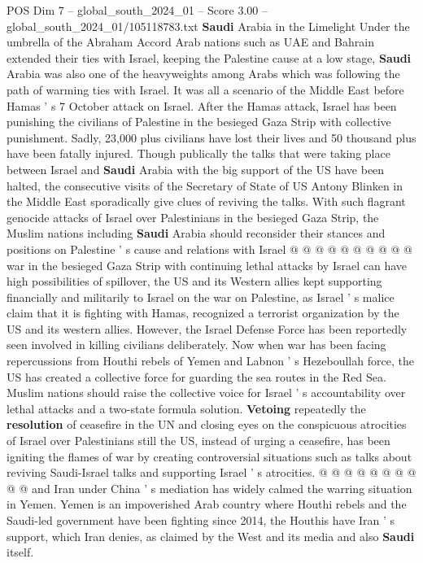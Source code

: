 \begin{textsample}{POS Dim 7 – global\_south\_2024\_01 – Score 3.00 – global\_south\_2024\_01/105118783.txt}  \label{ex:f7_pos_040}
\textbf{Saudi} Arabia in the Limelight Under the umbrella of the Abraham Accord Arab nations such as UAE and Bahrain extended their ties with Israel, keeping the Palestine cause at a low stage, \textbf{Saudi} Arabia was also one of the heavyweights among Arabs which was following the path of warming ties with Israel.
It was all a scenario of the Middle East before Hamas ' s 7 October attack on Israel.
After the Hamas attack, Israel has been punishing the civilians of Palestine in the besieged Gaza Strip with collective punishment.
Sadly, 23,000 plus civilians have lost their lives and 50 thousand plus have been fatally injured.
Though publically the talks that were taking place between Israel and \textbf{Saudi} Arabia with the big support of the US have been halted, the consecutive visits of the Secretary of State of US Antony Blinken in the Middle East sporadically give clues of reviving the talks.
With such flagrant genocide attacks of Israel over Palestinians in the besieged Gaza Strip, the Muslim nations including \textbf{Saudi} Arabia should reconsider their stances and positions on Palestine ' s cause and relations with Israel @ @ @ @ @ @ @ @ @ @ war in the besieged Gaza Strip with continuing lethal attacks by Israel can have high possibilities of spillover, the US and its Western allies kept supporting financially and militarily to Israel on the war on Palestine, as Israel ' s malice claim that it is fighting with Hamas, recognized a terrorist organization by the US and its western allies.
However, the Israel Defense Force has been reportedly seen involved in killing civilians deliberately.
Now when war has been facing repercussions from Houthi rebels of Yemen and Labnon ' s Hezeboullah force, the US has created a collective force for guarding the sea routes in the Red Sea.
Muslim nations should raise the collective voice for Israel ' s accountability over lethal attacks and a two-state formula solution. \textbf{Vetoing} repeatedly the \textbf{resolution} of ceasefire in the UN and closing eyes on the conspicuous atrocities of Israel over Palestinians still the US, instead of urging a ceasefire, has been igniting the flames of war by creating controversial situations such as talks about reviving Saudi-Israel talks and supporting Israel ' s atrocities. @ @ @ @ @ @ @ @ @ @ and Iran under China ' s mediation has widely calmed the warring situation in Yemen.
Yemen is an impoverished Arab country where Houthi rebels and the Saudi-led government have been fighting since 2014, the Houthis have Iran ' s support, which Iran denies, as claimed by the West and its media and also \textbf{Saudi} itself.

\end{textsample}
